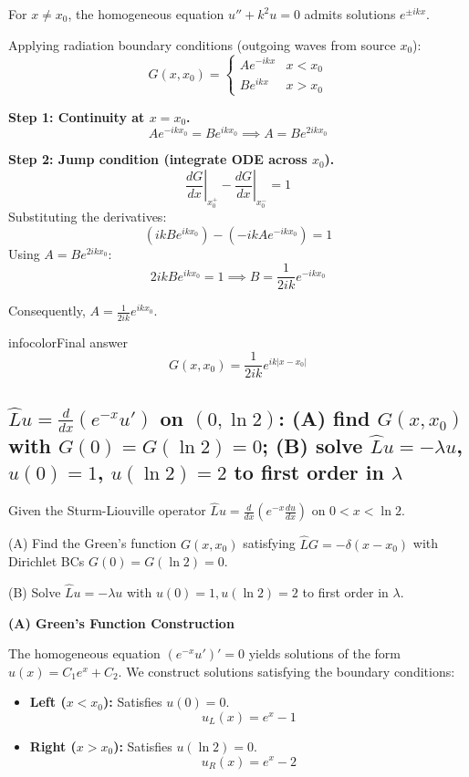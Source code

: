 \documentclass[a4paper,11pt]{article} %
\newenvironment{summarybox}[1][]{\begin{custombox}[#1]{infocolor}{Final answer}}{\end{custombox}}
\begin{document}
For $x \neq x_0$, the homogeneous equation $u'' + k^2 u = 0$ admits solutions $e^{\pm ikx}$.

Applying radiation boundary conditions (outgoing waves from source $x_0$):
$$ G(x, x_0) = \begin{cases} A e^{-ikx} & x < x_0 \\ B e^{ikx} & x > x_0 \end{cases} $$

\textbf{Step 1: Continuity at $x = x_0$.}
$$ A e^{-ikx_0} = B e^{ikx_0} \implies A = B e^{2ikx_0} $$

\textbf{Step 2: Jump condition (integrate ODE across $x_0$).}
$$ \left.\frac{dG}{dx}\right|_{x_0^+} - \left.\frac{dG}{dx}\right|_{x_0^-} = 1 $$
Substituting the derivatives:
$$ (ik B e^{ikx_0}) - (-ik A e^{-ikx_0}) = 1 $$
Using $A = B e^{2ikx_0}$:
$$ 2ik B e^{ikx_0} = 1 \implies B = \frac{1}{2ik} e^{-ikx_0} $$

Consequently, $A = \frac{1}{2ik} e^{ikx_0}$.

\begin{summarybox}[title={Part A Answer}]
$$ G(x, x_0) = \frac{1}{2ik} e^{ik|x - x_0|} $$
\end{summarybox}



\newpage

\subsection{\texorpdfstring{$\hat{L}u=\tfrac{d}{dx}(e^{-x}u')$ on $(0,\ln 2)$: (A) find $G(x,x_0)$ with $G(0)=G(\ln 2)=0$; (B) solve $\hat{L}u=-\lambda u$, $u(0)=1$, $u(\ln 2)=2$ to first order in $\lambda$}{(A) Green's function for exponential-weight SL operator; (B) perturbation expansion: zeroth order $u_0=e^x$}}

\begin{problembox}
Given the Sturm-Liouville operator $\hat{L}u = \frac{d}{dx} \left( e^{-x} \frac{du}{dx} \right)$ on $0 < x < \ln 2$.

(A) Find the Green's function $G(x, x_0)$ satisfying $\hat{L}G = -\delta(x-x_0)$ with Dirichlet BCs $G(0)=G(\ln 2)=0$.

(B) Solve $\hat{L}u = -\lambda u$ with $u(0)=1, u(\ln 2)=2$ to first order in $\lambda$.
\end{problembox}

\textbf{(A) Green's Function Construction}

The homogeneous equation $(e^{-x}u')' = 0$ yields solutions of the form $u(x) = C_1 e^x + C_2$.
We construct solutions satisfying the boundary conditions:
\begin{itemize}
    \item \textbf{Left ($x < x_0$):} Satisfies $u(0)=0$.
    $$ u_L(x) = e^x - 1 $$
    \item \textbf{Right ($x > x_0$):} Satisfies $u(\ln 2)=0$.
    $$ u_R(x) = e^x - 2 $$
\end{itemize}
\end{document}
